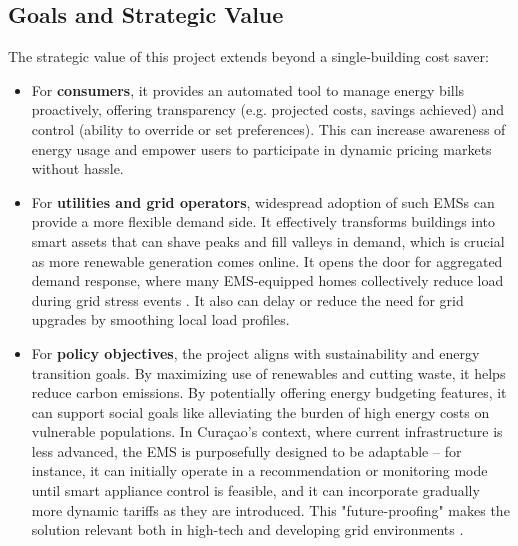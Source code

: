 \documentclass[12pt,a4paper]{article}
\begin{document}
\subsection*{Goals and Strategic Value}
The strategic value of this project extends beyond a single-building cost saver:
\begin{itemize}
    \item For \textbf{consumers}, it provides an automated tool to manage energy bills proactively, offering transparency (e.g. projected costs, savings achieved) and control (ability to override or set preferences). This can increase awareness of energy usage and empower users to participate in dynamic pricing markets without hassle.
    \item For \textbf{utilities and grid operators}, widespread adoption of such EMSs can provide a more flexible demand side. It effectively transforms buildings into smart assets that can shave peaks and fill valleys in demand, which is crucial as more renewable generation comes online. It opens the door for aggregated demand response, where many EMS-equipped homes collectively reduce load during grid stress events \cite{Koltsaklis2019}. It also can delay or reduce the need for grid upgrades by smoothing local load profiles.
    \item For \textbf{policy objectives}, the project aligns with sustainability and energy transition goals. By maximizing use of renewables and cutting waste, it helps reduce carbon emissions. By potentially offering energy budgeting features, it can support social goals like alleviating the burden of high energy costs on vulnerable populations. In Curaçao's context, where current infrastructure is less advanced, the EMS is purposefully designed to be adaptable – for instance, it can initially operate in a recommendation or monitoring mode until smart appliance control is feasible, and it can incorporate gradually more dynamic tariffs as they are introduced. This "future-proofing" makes the solution relevant both in high-tech and developing grid environments \cite{Rehman2025}.
\end{itemize}
\end{document}

